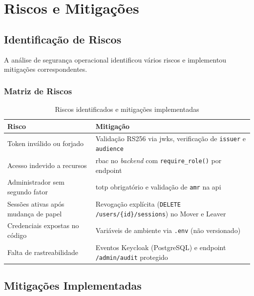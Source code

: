 \chapter{Riscos e Mitigações}
\label{chap:riscos}

\section{Identificação de Riscos}

A análise de segurança operacional identificou vários riscos e implementou mitigações correspondentes.

\subsection{Matriz de Riscos}

\begin{table}[h!]
\centering
\caption{Riscos identificados e mitigações implementadas}
\label{tab:riscos}
\begin{tabularx}{\textwidth}{|X|X|}
\hline
\textbf{Risco} & \textbf{Mitigação} \\ \hline
Token inválido ou forjado & Validação RS256 via \gls{jwks}, verificação de \texttt{issuer} e \texttt{audience} \\ \hline
Acesso indevido a recursos & \gls{rbac} no \textit{backend} com \texttt{require\_role()} por endpoint \\ \hline
Administrador sem segundo fator & \gls{totp} obrigatório e validação de \texttt{amr} na \gls{api} \\ \hline
Sessões ativas após mudança de papel & Revogação explícita (\texttt{DELETE /users/\{id\}/sessions}) no Mover e Leaver \\ \hline
Credenciais expostas no código & Variáveis de ambiente via \texttt{.env} (não versionado) \\ \hline
Falta de rastreabilidade & Eventos Keycloak (PostgreSQL) e endpoint \texttt{/admin/audit} protegido \\ \hline
\end{tabularx}
\end{table}

\section{Mitigações Implementadas}

